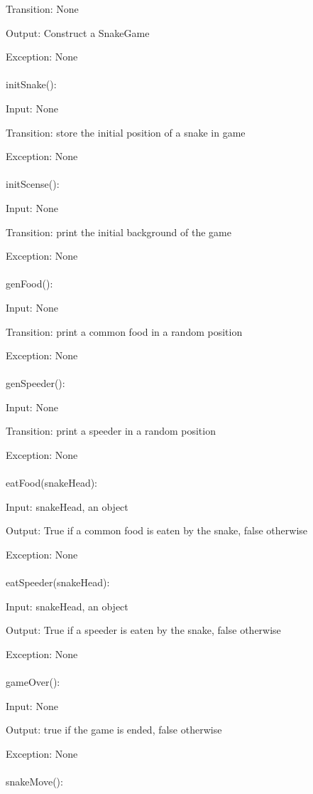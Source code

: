 \documentclass[12pt, titlepage]{article}
\begin{document}
		Transition: None
		
		Output: Construct a SnakeGame
		
		Exception: None \\
		\\
		initSnake():
		
		Input: None
		
		Transition: store the initial position of a snake in game
		
		Exception: None\\
		\\
		initScense():
		
		Input: None
		
		Transition: print the initial background of the game
				
		Exception: None\\
		\\
		genFood():
		
		Input: None
		
		Transition: print a common food in a random position
				
		Exception: None\\
		\\
		genSpeeder():
		
		Input: None
		
		Transition: print a speeder in a random position
				
		Exception: None\\
		\\
		eatFood(snakeHead):
		
		Input: snakeHead, an object
		
		Output: True if a common food is eaten by the snake, false otherwise
				
		Exception: None\\
		\\
        eatSpeeder(snakeHead):
		
		Input: snakeHead, an object
		
		Output: True if a speeder is eaten by the snake, false otherwise
				
		Exception: None\\
		\\
		gameOver():
		
		Input: None
		
		Output: true if the game is ended, false otherwise
				
		Exception: None\\
		\\
		snakeMove():
		
\end{document}
